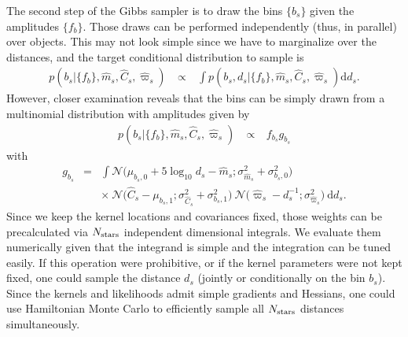 \documentclass[manuscript, letterpaper]{aastex6}
\makeatletter
\let\origsubsection\subsection
\renewcommand\subsection{\@ifstar{\starsubsection}{\nostarsubsection}}
\newcommand\nostarsubsection[1]{\subsectionprelude\origsubsection{#1}}
\newcommand\starsubsection[1]{\subsectionprelude\origsubsection*{#1}}
\newcommand\subsectionprelude{\vspace{1em}}
\newcommand{\eg}{{\textit{e.g.},~}}
\newcommand{\eqn}[1]{\begin{eqnarray}#1\end{eqnarray}}
\newcommand{\nobj}{{N_{\rm stars}}}
\makeatother
\begin{document}
The second step of the Gibbs sampler is to draw the bins $\{b_s\}$ given the amplitudes $\{f_b\}$. 
Those draws can be performed independently (thus, in parallel) over objects.
This may not look simple since we have to marginalize over the distances, and the target conditional distribution to sample is
\eqn{
	p\left(b_s \bigr\rvert \bigl\{ f_b \bigr\}, \hat{m}_s, \hat{C}_s, \hat{\varpi}_s\right) \ &\propto& \  \int p\left(b_s, d_s \bigr\rvert \bigl\{ f_b \bigr\}, \hat{m}_s, \hat{C}_s, \hat{\varpi}_s\right)  \mathrm{d} d_s.
}  
However, closer examination reveals that the bins can be simply drawn from a multinomial distribution with amplitudes given by
\eqn{
	p\left(b_s \bigr\rvert \bigl\{ f_b \bigr\}, \hat{m}_s, \hat{C}_s, \hat{\varpi}_s\right) \ &\propto& \ f_{b_s}  g_{b_s}
} 
with
\eqn{
	g_{b_s} &=& \int \mathcal{N}\bigl( \mu_{b_s,0} + 5\log_{10}d_s  -\hat{m}_s ;\sigma_{\hat{m}_s}^2 + \sigma_{b_s,0}^2 \bigr)    \\ && \times \ \mathcal{N}\bigl(\hat{C}_s - \mu_{b_s,1};\sigma_{\hat{C}_s}^2 + \sigma_{b_s,1}^2 \bigr) \ \mathcal{N}\bigl(\hat{\varpi}_s - d_s^{-1};\sigma_{\hat{\varpi}_s}^2 \bigr)\  \mathrm{d}  d_s.
}
Since we keep the kernel locations and covariances fixed, those weights can be precalculated via $\nobj$ independent dimensional integrals.
We evaluate them numerically given that the integrand is simple and the integration can be tuned easily. 
If this operation were prohibitive, or if the kernel parameters were not kept fixed, one could sample the distance $d_s$ (jointly or conditionally on the bin $b_s$).
Since the kernels and likelihoods admit simple gradients and Hessians, one could use Hamiltonian Monte Carlo \citep[\eg][]{Duane1987, Neal2012} to efficiently sample all $\nobj$ distances simultaneously.


\subsection{Discussion}
\end{document}
